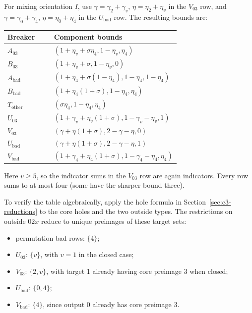 \documentclass[11pt]{article}
\theoremstyle{definition}
\theoremstyle{plain}
\begin{document}
For mixing orientation \(I\), use \(\gamma=\gamma_2+\gamma_v\), \(\eta=\eta_2+\eta_v\) in the \(V_{03}\) row, and \(\gamma=\gamma_0+\gamma_4\), \(\eta=\eta_0+\eta_4\) in the \(U_{\mathrm{bad}}\) row. The resulting bounds are:

\begin{center}
\begin{tabular}{lp{0.69\linewidth}}
\toprule
Breaker
 & Component bounds
 \\
\midrule

\(A_{03}\) & \((1+\eta_v+\sigma \eta_{4},1-\eta_v,\eta_{4})\)\\
\(B_{03}\) & \((1+\eta_v+\sigma,1-\eta_v,0)\)\\
\(A_{\mathrm{bad}}\) & \((1+\eta_{4}+\sigma(1-\eta_{4}),1-\eta_{4},1-\eta_{4})\)\\
\(B_{\mathrm{bad}}\) & \((1+\eta_{4}(1+\sigma),1-\eta_{4},\eta_{4})\)\\
\(T_{\mathrm{other}}\) & \((\sigma \eta_{4},1-\eta_{4},\eta_{4})\)\\
\(U_{03}\) & \((1+\gamma_v+\eta_v(1+\sigma),1-\gamma_v-\eta_v,1)\)\\
\(V_{03}\) & \((\gamma+\eta(1+\sigma),2-\gamma-\eta,0)\)\\
\(U_{\mathrm{bad}}\) & \((\gamma+\eta(1+\sigma),2-\gamma-\eta,1)\)\\
\(V_{\mathrm{bad}}\) & \((1+\gamma_{4}+\eta_{4}(1+\sigma),1-\gamma_{4}-\eta_{4},\eta_{4})\)\\
\bottomrule
\end{tabular}
\end{center}

Here \(v\ge 5\), so the indicator sums in the \(V_{03}\) row are again
indicators. Every row sums to at most four (some have the sharper bound three).

To verify the table algebraically, apply the hole formula in Section~\ref{sec:c3-reductions}
to the core holes and the two outside types. The restrictions on outside
\(02x\) reduce to unique preimages of these target sets:

\begin{itemize}
\item
  permutation bad rows: \(\{4\}\);
\item
  \(U_{03}\): \(\{v\}\), with \(v=1\) in the closed case;
\item
  \(V_{03}\): \(\{2,v\}\), with target 1 already having core preimage 3
  when closed;
\item
  \(U_{\mathrm{bad}}\): \(\{0,4\}\);
\item
  \(V_{\mathrm{bad}}\): \(\{4\}\), since output 0 already has core preimage 3.
\end{itemize}
\end{document}
